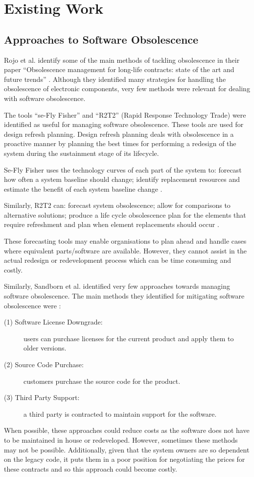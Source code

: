 \documentclass{UoYCSproject}
\begin{document}
\section{Existing Work}
\subsection{Approaches to Software Obsolescence} \label{so_approaches}
Rojo et al. identify some of the main methods of tackling obsolescence in their paper ``Obsolescence management for long-life contracts: state of the art and future trends'' \parencite{rojo2010obsolescence}. Although they identified many strategies for handling the obsolescence of electronic components, very few methods were relevant for dealing with software obsolescence.

The tools ``se-Fly Fisher'' and ``R2T2'' (Rapid Response Technology Trade) were identified as useful for managing software obsolescence. These tools are used for design refresh planning. Design refresh planning deals with obsolescence in a proactive manner by planning the best times for performing a redesign of the system during the sustainment stage of its lifecycle. 

Se-Fly Fisher uses the technology curves of each part of the system to: forecast how often a system baseline should change; identify replacement resources and estimate the benefit of each system baseline change \parencite{rojo2010obsolescence}.

Similarly, R2T2 can: forecast system obsolescence; allow for comparisons to alternative solutions; produce a life cycle obsolescence plan for the elements that require refreshment and plan when element replacements should occur \parencite{herald2009obsolescence}.

These forecasting tools may enable organisations to plan ahead and handle cases where equivalent parts/software are available. However, they cannot assist in the actual redesign or redevelopment process which can be time consuming and costly.

Similarly, Sandborn et al. identified very few approaches towards managing software obsolescence. The main methods they identified for mitigating software obsolescence were \parencite{sandborn2007obsolescence}:
\begin{description}
\item[(1) Software License Downgrade:] users can purchase licenses for the current product and apply them to older versions.
\item[(2) Source Code Purchase:] customers purchase the source code for the product.
\item[(3) Third Party Support:] a third party is contracted to maintain support for the software.
\end{description}
When possible, these approaches could reduce costs as the software does not have to be maintained in house or redeveloped. However, sometimes these methods may not be possible. Additionally, given that the system owners are so dependent on the legacy code, it puts them in a poor position for negotiating the prices for these contracts and so this approach could become costly.
\end{document}
